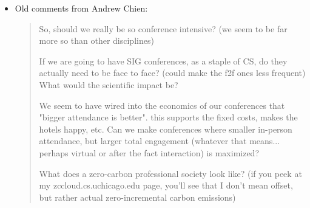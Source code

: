 \documentclass[12pt]{article}
\begin{document}
\begin{itemize}
\item Old comments from Andrew Chien:
\begin{quote}
So, should we really be so conference intensive? (we seem to be far more so than other disciplines)

If we are going to have SIG conferences, as a staple of CS, do they actually need to be face to face?  (could
make the f2f ones less frequent)  What would the scientific impact be?

We seem to have wired into the economics of our conferences that "bigger attendance is better".  this supports
the fixed costs, makes the hotels happy, etc.  Can we make conferences where smaller in-person attendance, but
larger total engagement (whatever that means... perhaps virtual or after the fact interaction) is maximized?

What does a zero-carbon professional society look like?  (if you peek at my zccloud.cs.uchicago.edu page, you'll
see that I don't mean offset, but rather actual zero-incremental carbon emissions)


\end{quote}
\end{itemize}
\end{document}
